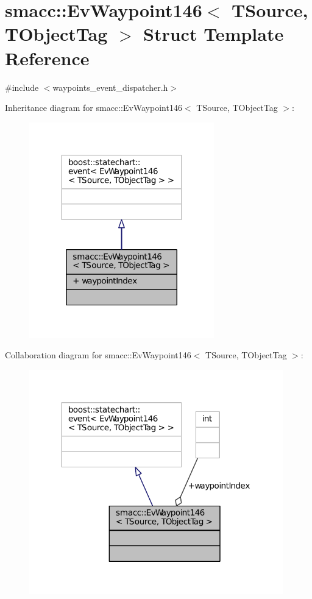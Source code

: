 \hypertarget{structsmacc_1_1EvWaypoint146}{}\section{smacc\+:\+:Ev\+Waypoint146$<$ T\+Source, T\+Object\+Tag $>$ Struct Template Reference}
\label{structsmacc_1_1EvWaypoint146}


{\ttfamily \#include $<$waypoints\+\_\+event\+\_\+dispatcher.\+h$>$}



Inheritance diagram for smacc\+:\+:Ev\+Waypoint146$<$ T\+Source, T\+Object\+Tag $>$\+:
\nopagebreak
\begin{figure}[H]
\begin{center}
\leavevmode
\includegraphics[width=227pt]{structsmacc_1_1EvWaypoint146__inherit__graph}
\end{center}
\end{figure}


Collaboration diagram for smacc\+:\+:Ev\+Waypoint146$<$ T\+Source, T\+Object\+Tag $>$\+:
\nopagebreak
\begin{figure}[H]
\begin{center}
\leavevmode
\includegraphics[width=312pt]{structsmacc_1_1EvWaypoint146__coll__graph}
\end{center}
\end{figure}
